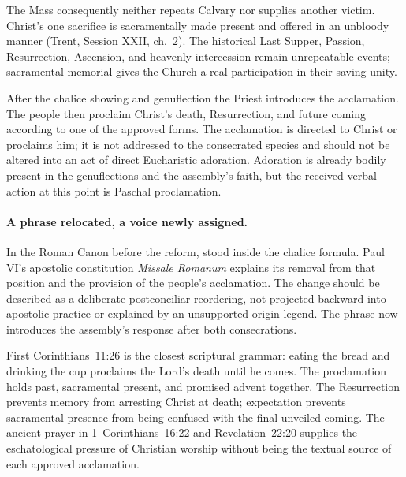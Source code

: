 The Mass consequently neither repeats Calvary nor supplies another victim. Christ's one sacrifice is sacramentally made present and offered in an unbloody manner (Trent, Session XXII, ch.~2). The historical Last Supper, Passion, Resurrection, Ascension, and heavenly intercession remain unrepeatable events; sacramental memorial gives the Church a real participation in their saving unity.


After the chalice showing and genuflection the Priest introduces the acclamation. The people then proclaim Christ's death, Resurrection, and future coming according to one of the approved forms. The acclamation is directed to Christ or proclaims him; it is not addressed to the consecrated species and should not be altered into an act of direct Eucharistic adoration. Adoration is already bodily present in the genuflections and the assembly's faith, but the received verbal action at this point is Paschal proclamation.

\paragraph{A phrase relocated, a voice newly assigned.}
In the Roman Canon before the reform,  stood inside the chalice formula. Paul VI's apostolic constitution \emph{Missale Romanum} explains its removal from that position and the provision of the people's acclamation. The change should be described as a deliberate postconciliar reordering, not projected backward into apostolic practice or explained by an unsupported origin legend. The phrase now introduces the assembly's response after both consecrations.

First Corinthians~11:26 is the closest scriptural grammar: eating the bread and drinking the cup proclaims the Lord's death until he comes. The proclamation holds past, sacramental present, and promised advent together. The Resurrection prevents memory from arresting Christ at death; expectation prevents sacramental presence from being confused with the final unveiled coming. The ancient prayer  in 1~Corinthians~16:22 and Revelation~22:20 supplies the eschatological pressure of Christian worship without being the textual source of each approved acclamation.

